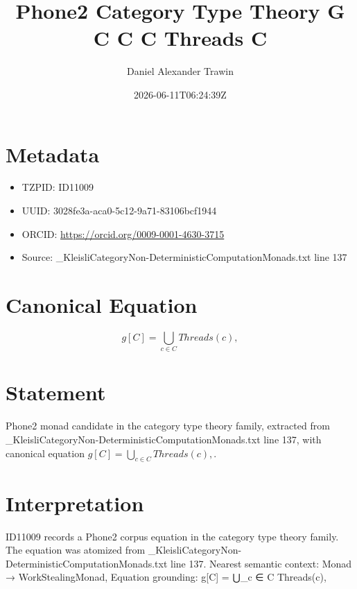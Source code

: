 \documentclass[11pt]{article}
\title{Phone2 Category Type Theory G C C C Threads C}
\author{Daniel Alexander Trawin}
\date{2026-06-11T06:24:39Z}
\begin{document}
\maketitle
\section*{Metadata}
\begin{itemize}
\item TZPID: ID11009
\item UUID: 3028fe3a-aca0-5c12-9a71-83106bcf1944
\item ORCID: \url{https://orcid.org/0009-0001-4630-3715}
\item Source: _KleisliCategoryNon-DeterministicComputationMonads.txt line 137
\end{itemize}
\section*{Canonical Equation}
\[
g[C] = ⋃_{c ∈ C} Threads(c),
\]
\section*{Statement}
Phone2 monad candidate in the category type theory family, extracted from _KleisliCategoryNon-DeterministicComputationMonads.txt line 137, with canonical equation $g[C] = ⋃_{c ∈ C} Threads(c),$.
\section*{Interpretation}
ID11009 records a Phone2 corpus equation in the category type theory family. The equation was atomized from _KleisliCategoryNon-DeterministicComputationMonads.txt line 137. Nearest semantic context: Monad → WorkStealingMonad, Equation grounding: g[C] = ⋃_{c ∈ C} Threads(c),
\end{document}
